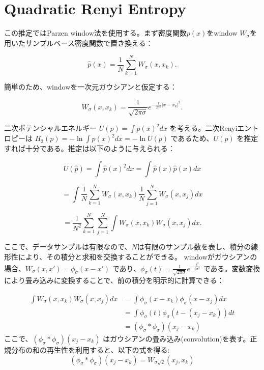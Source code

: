 \documentclass[dvipdfmx,a4paper]{jsarticle}%
\begin{document}
\section{\textbf{Quadratic Renyi Entropy}}
\begin{dfn}\label{def:renyi-entropy}
  この推定ではParzen window法を使用する。まず密度関数$p(x)$をwindow $W_\sigma$を用いたサンプルベース密度関数で置き換える：

$$\hat{p}(x) = \frac{1}{N} \sum_{k=1}^{N} W_\sigma(x, x_k).$$

\noindent
簡単のため、windowを一次元ガウシアンと仮定する：

$$W_\sigma(x, x_k) = \frac{1}{\sqrt{2\pi\sigma}} e^{-\frac{1}{2\sigma^2}|x-x_k|^2}.$$

二次ポテンシャルエネルギー $U(p) = \int p(x)^2 dx$ を考える。二次Renyiエントロピーは $H_2(p) = -\ln \int \hat{p}(x)^2 dx = -\ln U(p)$ であるため、$U(p)$ を推定すれば十分である。推定は以下のように与えられる：

$$U(\hat{p}) = \int \hat{p}(x)^2 dx = \int \hat{p}(x)\hat{p}(x) dx$$

$$= \int \frac{1}{N} \sum_{k=1}^N W_\sigma(x, x_k) \frac{1}{N} \sum_{j=1}^N W_\sigma(x, x_j) dx$$

$$= \frac{1}{N^2} \sum_{k=1}^N \sum_{j=1}^N \int W_\sigma(x, x_k)W_\sigma(x, x_j) dx.$$

ここで、データサンプルは有限なので、$N$は有限のサンプル数を表し、積分の線形性により、その積分と求和を交換することができる。
\newpage
windowがガウシアンの場合、$W_\sigma(x, x') = \phi_\sigma(x - x')$ であり、$\phi_\sigma(t) = \frac{1}{\sqrt{2\pi\sigma}} e^{-\frac{t^2}{2\sigma^2}}$ である。変数変換により畳み込みに変換することで、前の積分を明示的に計算できる：

\begin{align*}
\int W_\sigma(x,x_k)W_\sigma(x,x_j) dx &= \int \phi_\sigma(x - x_k)\phi_\sigma(x - x_j) dx \\
&= \int \phi_\sigma(t)\phi_\sigma(t - (x_j - x_k)) dt\\
&=  (\phi_\sigma * \phi_\sigma)(x_j - x_k)
\end{align*}
ここで、$(\phi_\sigma * \phi_\sigma)(x_j - x_k)$ はガウシアンの畳み込み(convolution)\footnotemark[1]を表す。正規分布の和の再生性\footnotemark[2]を利用すると、以下の式を得る:
$$(\phi_\sigma * \phi_\sigma)(x_j - x_k)=W_{\sigma\sqrt{2}}(x_j, x_k)$$


\end{dfn}
\end{document}
